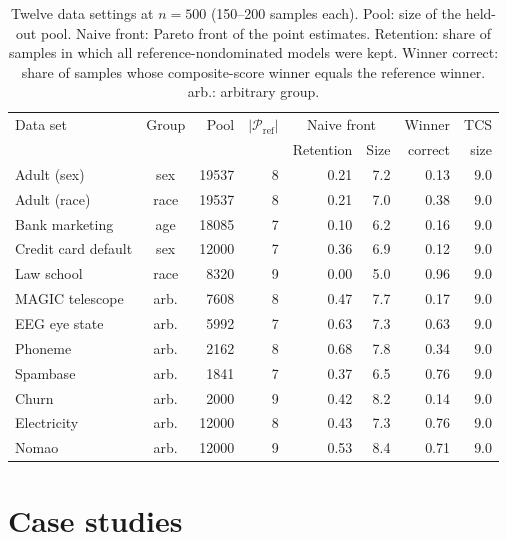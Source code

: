 \documentclass[pdflatex,sn-mathphys-num,iicol]{sn-jnl}
\theoremstyle{thmstyleone}
\theoremstyle{thmstyletwo}
\begin{document}
\begin{table}[t]\centering\small
\caption{Twelve data settings at $n=500$ (150--200 samples each). Pool: size of the held-out pool. Naive front: Pareto front of the point estimates. Retention: share of samples in which all reference-nondominated models were kept. Winner correct: share of samples whose composite-score winner equals the reference winner. arb.: arbitrary group.}\label{tab:multi}
\begin{tabular}{lcrrrrrr}\toprule
Data set & Group & Pool & $|\mathcal{P}_{\mathrm{ref}}|$ & \multicolumn{2}{c}{Naive front} & Winner & TCS \\
 & & & & Retention & Size & correct & size \\\midrule
Adult (sex) & sex & 19537 & 8 & 0.21 & 7.2 & 0.13 & 9.0 \\
Adult (race) & race & 19537 & 8 & 0.21 & 7.0 & 0.38 & 9.0 \\
Bank marketing & age & 18085 & 7 & 0.10 & 6.2 & 0.16 & 9.0 \\
Credit card default & sex & 12000 & 7 & 0.36 & 6.9 & 0.12 & 9.0 \\
Law school & race & 8320 & 9 & 0.00 & 5.0 & 0.96 & 9.0 \\
MAGIC telescope & arb. & 7608 & 8 & 0.47 & 7.7 & 0.17 & 9.0 \\
EEG eye state & arb. & 5992 & 7 & 0.63 & 7.3 & 0.63 & 9.0 \\
Phoneme & arb. & 2162 & 8 & 0.68 & 7.8 & 0.34 & 9.0 \\
Spambase & arb. & 1841 & 7 & 0.37 & 6.5 & 0.76 & 9.0 \\
Churn & arb. & 2000 & 9 & 0.42 & 8.2 & 0.14 & 9.0 \\
Electricity & arb. & 12000 & 8 & 0.43 & 7.3 & 0.76 & 9.0 \\
Nomao & arb. & 12000 & 9 & 0.53 & 8.4 & 0.71 & 9.0 \\
\bottomrule\end{tabular}
\end{table}

\section{Case studies}
\end{document}
